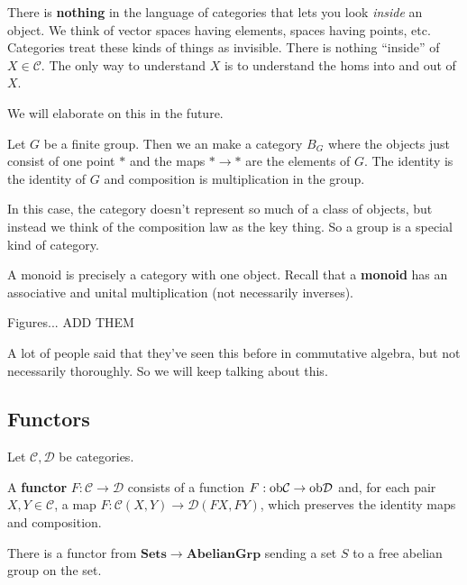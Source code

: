 There is \textbf{nothing} in the language of categories that lets you look
\emph{inside} an object. We think of vector spaces having elements, spaces
having points, etc. Categories treat these kinds of things as invisible. There
is nothing ``inside'' of $X \in \mathcal{C}$. The only way to understand $X$ is
to understand the homs into and out of $X$. 

We will elaborate on this in the future.


\begin{example} 
Let $G$ be a finite group. Then we an make a category $B_G$ where the objects
just consist of one point $\ast$ and the maps $\ast \to \ast$ are the elements
of $G$. The identity is the identity of $G$ and composition is multiplication
in the group. 

In this case, the category doesn't represent so much of a class of objects, but
instead we think of the composition law as the key thing. So a group is a
special kind of category.
\end{example} 

\begin{example} 
A monoid is precisely a category with one object. Recall that a \textbf{monoid}
has an associative and unital multiplication (not necessarily inverses).
\end{example} 


Figures... ADD THEM

\begin{remark} 
A lot of people said that they've seen this before in commutative algebra, but not necessarily
thoroughly.  So we will keep talking about this.
\end{remark} 


\subsection{Functors}
Let $\mathcal{C}, \mathcal{D}$ be categories.

\begin{definition} 
A \textbf{functor} $F: \mathcal{C} \to \mathcal{D}$ consists of a function $F:
\mathrm{ob} \mathcal{C} \to \mathrm{ob} \mathcal{D}$ and, for each pair $X, Y \in \mathcal{C}$,
a map
$F: \mathcal{C}(X, Y) \to \mathcal{D}(FX, FY)$, which preserves the identity
maps and composition. 
\end{definition} 

\begin{example} 
There is a functor from $\mathbf{Sets} \to \mathbf{AbelianGrp}$ sending a set
$S$ to a free abelian group on the set.
\end{example} 

